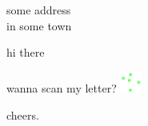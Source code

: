 \documentclass[a4paper,10pt]{scrlttr2}
\begin{document}
\begin{letter}{some address\\in some town}

\opening{hi there}


wanna scan my letter?
\includegraphics[width=7mm]{EURion.pdf}


\closing{cheers.}

\end{letter}
\end{document}
